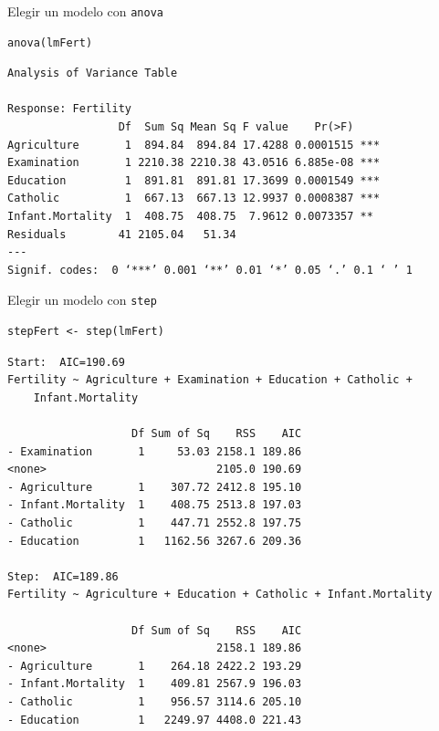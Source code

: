 \documentclass[xcolor={usenames,svgnames,dvipsnames}]{beamer}
\begin{document}
\begin{frame}[fragile,label=sec-5-12]{Elegir un modelo con \texttt{anova}}
 \lstset{language=R,label= ,caption= ,numbers=none}
\begin{lstlisting}
anova(lmFert)
\end{lstlisting}

\begin{verbatim}
Analysis of Variance Table

Response: Fertility
                 Df  Sum Sq Mean Sq F value    Pr(>F)    
Agriculture       1  894.84  894.84 17.4288 0.0001515 ***
Examination       1 2210.38 2210.38 43.0516 6.885e-08 ***
Education         1  891.81  891.81 17.3699 0.0001549 ***
Catholic          1  667.13  667.13 12.9937 0.0008387 ***
Infant.Mortality  1  408.75  408.75  7.9612 0.0073357 ** 
Residuals        41 2105.04   51.34                      
---
Signif. codes:  0 ‘***’ 0.001 ‘**’ 0.01 ‘*’ 0.05 ‘.’ 0.1 ‘ ’ 1
\end{verbatim}
\end{frame}

\begin{frame}[fragile,label=sec-5-13]{Elegir un modelo con \texttt{step}}
 \lstset{language=R,label= ,caption= ,numbers=none}
\begin{lstlisting}
stepFert <- step(lmFert)
\end{lstlisting}

\begin{verbatim}
Start:  AIC=190.69
Fertility ~ Agriculture + Examination + Education + Catholic + 
    Infant.Mortality

                   Df Sum of Sq    RSS    AIC
- Examination       1     53.03 2158.1 189.86
<none>                          2105.0 190.69
- Agriculture       1    307.72 2412.8 195.10
- Infant.Mortality  1    408.75 2513.8 197.03
- Catholic          1    447.71 2552.8 197.75
- Education         1   1162.56 3267.6 209.36

Step:  AIC=189.86
Fertility ~ Agriculture + Education + Catholic + Infant.Mortality

                   Df Sum of Sq    RSS    AIC
<none>                          2158.1 189.86
- Agriculture       1    264.18 2422.2 193.29
- Infant.Mortality  1    409.81 2567.9 196.03
- Catholic          1    956.57 3114.6 205.10
- Education         1   2249.97 4408.0 221.43
\end{verbatim}
\end{frame}
\end{document}
